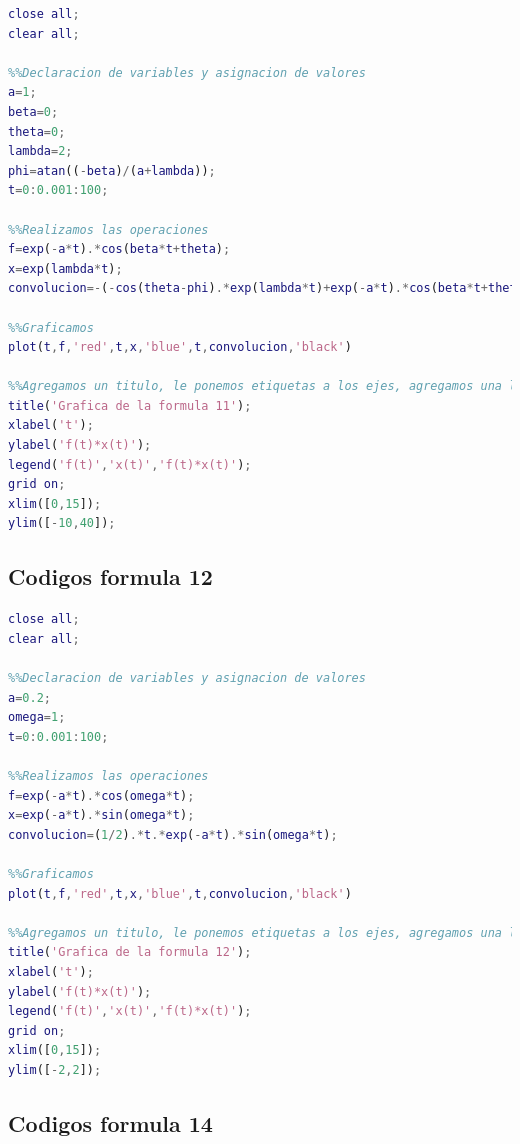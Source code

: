 \documentclass[10pt]{article}
\begin{document}
\begin{lstlisting}[language=Matlab,label=grafica11,caption=Código para graficar la formula 11]
%%Cierra todas las ventanas y limpia las variables almacenadas
close all;
clear all;

%%Declaracion de variables y asignacion de valores
a=1;
beta=0;
theta=0;
lambda=2;
phi=atan((-beta)/(a+lambda));
t=0:0.001:100;

%%Realizamos las operaciones
f=exp(-a*t).*cos(beta*t+theta);
x=exp(lambda*t);
convolucion=-(-cos(theta-phi).*exp(lambda*t)+exp(-a*t).*cos(beta*t+theta-phi))/(sqrt(((a+lambda)^2)+beta^2));

%%Graficamos
plot(t,f,'red',t,x,'blue',t,convolucion,'black')

%%Agregamos un titulo, le ponemos etiquetas a los ejes, agregamos una leyenda a la grafica, le ponemos cuadricula y le asignamos limites a los ejes x e y 
title('Grafica de la formula 11');
xlabel('t');
ylabel('f(t)*x(t)');
legend('f(t)','x(t)','f(t)*x(t)');
grid on;
xlim([0,15]);
ylim([-10,40]);
\end{lstlisting}

\newpage
\subsection{Codigos formula 12}

\begin{lstlisting}[language=Matlab,label=grafica12,caption=Código para graficar la formula 12]
%%Cierra todas las ventanas y limpia las variables almacenadas
close all;
clear all;

%%Declaracion de variables y asignacion de valores
a=0.2;
omega=1;
t=0:0.001:100;

%%Realizamos las operaciones
f=exp(-a*t).*cos(omega*t);
x=exp(-a*t).*sin(omega*t);
convolucion=(1/2).*t.*exp(-a*t).*sin(omega*t);

%%Graficamos
plot(t,f,'red',t,x,'blue',t,convolucion,'black')

%%Agregamos un titulo, le ponemos etiquetas a los ejes, agregamos una leyenda a la grafica, le ponemos cuadricula y le asignamos limites a los ejes x e y 
title('Grafica de la formula 12');
xlabel('t');
ylabel('f(t)*x(t)');
legend('f(t)','x(t)','f(t)*x(t)');
grid on;
xlim([0,15]);
ylim([-2,2]);
\end{lstlisting}

\newpage
\subsection{Codigos formula 14}
\end{document}

